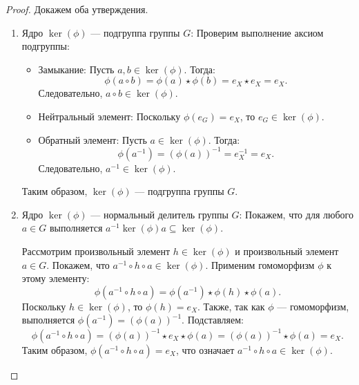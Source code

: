 \begin{proof}
    Докажем оба утверждения.

    \begin{enumerate}
        \item Ядро \( \ker(\phi) \) — подгруппа группы \( G \):
              Проверим выполнение аксиом подгруппы:
              \begin{itemize}
                  \item Замыкание:
                        Пусть \( a, b \in \ker(\phi) \). Тогда:
                        \[
                        \phi(a \circ b) = \phi(a) \star \phi(b) = e_X \star e_X = e_X.
                        \]
                        Следовательно, \( a \circ b \in \ker(\phi) \).

                  \item Нейтральный элемент:
                        Поскольку \( \phi(e_G) = e_X \), то \( e_G \in \ker(\phi) \).

                  \item Обратный элемент:
                        Пусть \( a \in \ker(\phi) \). Тогда:
                        \[
                        \phi(a^{-1}) = (\phi(a))^{-1} = e_X^{-1} = e_X.
                        \]
                        Следовательно, \( a^{-1} \in \ker(\phi) \).
              \end{itemize}
              Таким образом, \( \ker(\phi) \) — подгруппа группы \( G \).

        \item Ядро \( \ker(\phi) \) — нормальный делитель группы \( G \):
              Покажем, что для любого \( a \in G \) выполняется \( a^{-1} \ker(\phi) a \subseteq \ker(\phi) \).

              Рассмотрим произвольный элемент \( h \in \ker(\phi) \) и произвольный элемент \( a \in G \). Покажем, что \( a^{-1} \circ h \circ a \in \ker(\phi) \). Применим гомоморфизм \( \phi \) к этому элементу:
              \[
              \phi(a^{-1} \circ h \circ a) = \phi(a^{-1}) \star \phi(h) \star \phi(a).
              \]
              Поскольку \( h \in \ker(\phi) \), то \( \phi(h) = e_X \). Также, так как \( \phi \) — гомоморфизм, выполняется \( \phi(a^{-1}) = (\phi(a))^{-1} \). Подставляем:
              \[
              \phi(a^{-1} \circ h \circ a) = (\phi(a))^{-1} \star e_X \star \phi(a) = (\phi(a))^{-1} \star \phi(a) = e_X.
              \]
              Таким образом, \( \phi(a^{-1} \circ h \circ a) = e_X \), что означает \( a^{-1} \circ h \circ a \in \ker(\phi) \).


\end{enumerate}
\end{proof}
